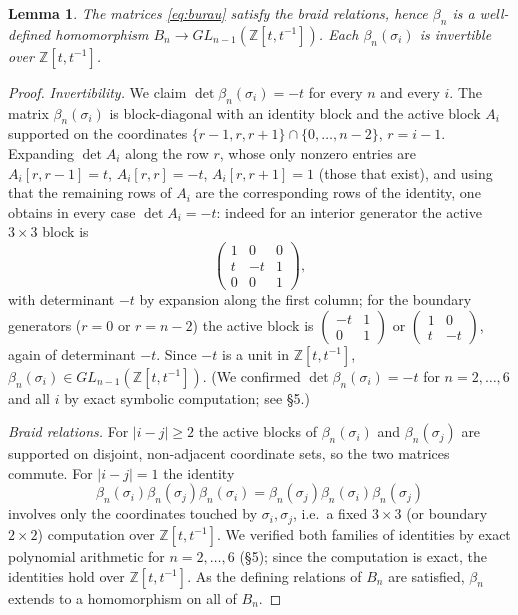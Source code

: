 \documentclass{amsart}
\newtheorem{lemma}{Lemma}
\theoremstyle{remark}
\begin{document}
\begin{lemma}\label{lem:rep}
The matrices \eqref{eq:burau} satisfy the braid relations, hence
$\beta_n$ is a well-defined homomorphism $B_n\to GL_{n-1}(\mathbb Z[t,t^{-1}])$.
Each $\beta_n(\sigma_i)$ is invertible over $\mathbb Z[t,t^{-1}]$.
\end{lemma}

\begin{proof}
\emph{Invertibility.} We claim $\det\beta_n(\sigma_i)=-t$ for every $n$ and
every $i$. The matrix $\beta_n(\sigma_i)$ is block-diagonal with an identity
block and the active block $A_i$ supported on the coordinates
$\{r-1,r,r+1\}\cap\{0,\dots,n-2\}$, $r=i-1$. Expanding $\det A_i$ along the row
$r$, whose only nonzero entries are $A_i[r,r-1]=t$, $A_i[r,r]=-t$,
$A_i[r,r+1]=1$ (those that exist), and using that the remaining rows of $A_i$ are
the corresponding rows of the identity, one obtains in every case
$\det A_i=-t$: indeed for an interior generator the active $3\times3$ block is
\[
\begin{pmatrix}1&0&0\\ t&-t&1\\ 0&0&1\end{pmatrix},
\]
with determinant $-t$ by expansion along the first column; for the boundary
generators ($r=0$ or $r=n-2$) the active block is
$\left(\begin{smallmatrix}-t&1\\0&1\end{smallmatrix}\right)$ or
$\left(\begin{smallmatrix}1&0\\ t&-t\end{smallmatrix}\right)$, again of
determinant $-t$. Since $-t$ is a unit in $\mathbb Z[t,t^{-1}]$,
$\beta_n(\sigma_i)\in GL_{n-1}(\mathbb Z[t,t^{-1}])$. (We confirmed
$\det\beta_n(\sigma_i)=-t$ for $n=2,\dots,6$ and all $i$ by exact symbolic
computation; see \S5.)

\emph{Braid relations.} For $|i-j|\ge2$ the active blocks of
$\beta_n(\sigma_i)$ and $\beta_n(\sigma_j)$ are supported on disjoint,
non-adjacent coordinate sets, so the two matrices commute. For $|i-j|=1$ the
identity
\[
\beta_n(\sigma_i)\beta_n(\sigma_j)\beta_n(\sigma_i)
=\beta_n(\sigma_j)\beta_n(\sigma_i)\beta_n(\sigma_j)
\]
involves only the coordinates touched by $\sigma_i,\sigma_j$, i.e.\ a fixed
$3\times3$ (or boundary $2\times2$) computation over $\mathbb Z[t,t^{-1}]$. We
verified both families of identities by exact polynomial arithmetic for
$n=2,\dots,6$ (\S5); since the computation is exact, the identities hold over
$\mathbb Z[t,t^{-1}]$. As the defining relations of $B_n$ are satisfied,
$\beta_n$ extends to a homomorphism on all of $B_n$.
\end{proof}
\end{document}
